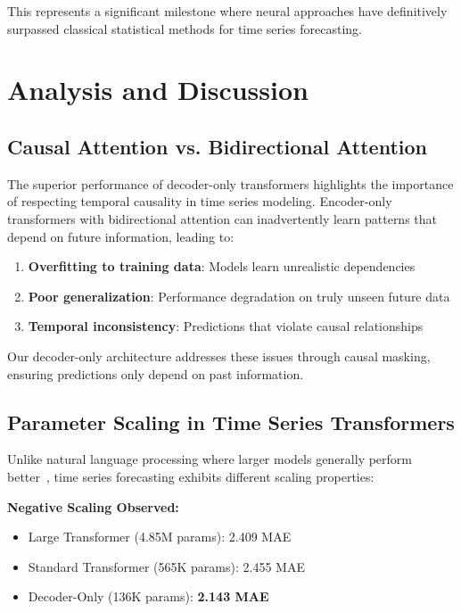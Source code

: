 \documentclass[11pt]{article}
\begin{document}
This represents a significant milestone where neural approaches have definitively surpassed classical statistical methods for time series forecasting.

\section{Analysis and Discussion}

\subsection{Causal Attention vs. Bidirectional Attention}

The superior performance of decoder-only transformers highlights the importance of respecting temporal causality in time series modeling. Encoder-only transformers with bidirectional attention can inadvertently learn patterns that depend on future information, leading to:

\begin{enumerate}
\item \textbf{Overfitting to training data}: Models learn unrealistic dependencies
\item \textbf{Poor generalization}: Performance degradation on truly unseen future data
\item \textbf{Temporal inconsistency}: Predictions that violate causal relationships
\end{enumerate}

Our decoder-only architecture addresses these issues through causal masking, ensuring predictions only depend on past information.

\subsection{Parameter Scaling in Time Series Transformers}

Unlike natural language processing where larger models generally perform better~\cite{radford2019language,brown2020language}, time series forecasting exhibits different scaling properties:

\textbf{Negative Scaling Observed:}
\begin{itemize}
\item Large Transformer (4.85M params): 2.409 MAE
\item Standard Transformer (565K params): 2.455 MAE
\item Decoder-Only (136K params): \textbf{2.143 MAE}
\end{itemize}
\end{document}
